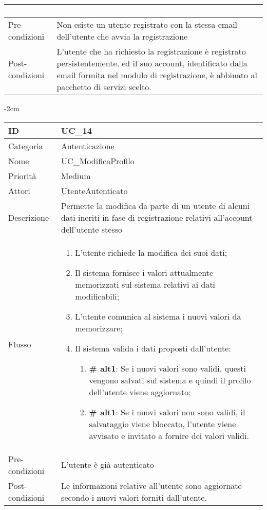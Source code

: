 \begin{center}
\begin{table}[bp]
\begin{tabular}{ |p{2.6cm}|p{13cm}|  }
\begin{enumerate}
\begin{enumerate}[  ]
			\end{enumerate}
		\end{enumerate}\\\hline
Pre-condizioni &  Non esiste un utente registrato con la stessa email dell'utente che avvia la registrazione\\\hline
Post-condizioni &  L'utente che ha richiesto la registrazione è registrato persistentemente, ed il suo account, identificato dalla email formita nel modulo di registrazione, è abbinato al pacchetto di servizi scelto.\\\hline
\end{tabular}
\label{table_use_case:13}\newline
\end{table}

\begin{table}[bp]
    \centering
    \addtolength{\leftskip} {-2cm}
\begin{tabular}{ |p{2.6cm}|p{13cm}|  }
\hline
ID & UC\_14\\\hline
Categoria & Autenticazione \\\hline
Nome & UC\_ModificaProfilo \\\hline
Priorità & Medium \\\hline
Attori &  UtenteAutenticato \\\hline
Descrizione & Permette la modifica da parte di un utente di alcuni dati ineriti in fase di registrazione relativi all'account dell'utente stesso  \\\hline
Flusso &  	\vspace{-5mm} \begin{enumerate}
			\item L'utente richiede la modifica dei suoi dati;
			\item Il sistema fornisce i valori attualmente memorizzati sul sistema relativi ai dati modificabili;
			\item L'utente comunica al sistema i nuovi valori da memorizzare;
			\item Il sistema valida i dati proposti dall'utente:
			\begin{enumerate}[  ]
				\item\textbf{\# alt1}: Se i nuovi valori sono validi, questi vengono salvati sul sistema e quindi il profilo dell'utente viene aggiornato;
				\item\textbf{\# alt1}: Se i nuovi valori non sono validi, il salvataggio viene bloccato, l'utente viene avvisato e invitato a fornire dei valori validi.
			\end{enumerate}
		\end{enumerate}\\\hline
Pre-condizioni &  L'utente è già autenticato\\\hline
Post-condizioni &  Le informazioni relative all'utente sono aggiornate secondo i nuovi valori forniti dall'utente.\\\hline
\end{tabular}
\label{table_use_case:14}\newline
\end{table}


\end{center}

